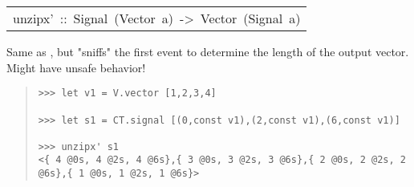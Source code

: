 \begin{haddockdesc}
\item[\begin{tabular}{@{}l}
unzipx'\ ::\ Signal\ (Vector\ a)\ ->\ Vector\ (Signal\ a)
\end{tabular}]\haddockbegindoc
Same as , but "sniffs" the first event to determine the length of the output vector. Might have unsafe behavior!\par
\begin{quote}
{\haddockverb\begin{verbatim}
>>> let v1 = V.vector [1,2,3,4]

>>> let s1 = CT.signal [(0,const v1),(2,const v1),(6,const v1)]

>>> unzipx' s1
<{ 4 @0s, 4 @2s, 4 @6s},{ 3 @0s, 3 @2s, 3 @6s},{ 2 @0s, 2 @2s, 2 @6s},{ 1 @0s, 1 @2s, 1 @6s}>

\end{verbatim}}
\end{quote}
\end{haddockdesc}